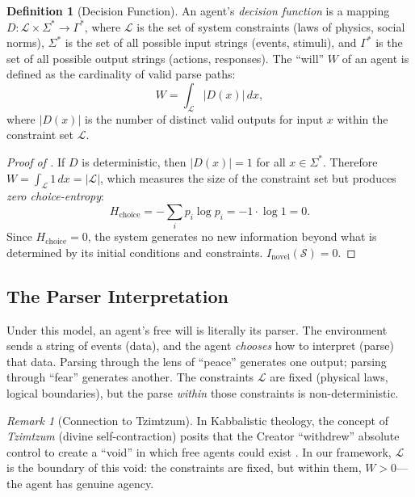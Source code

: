 \documentclass[12pt, a4paper]{article}
\theoremstyle{plain}
\theoremstyle{definition}
\newtheorem{definition}[theorem]{Definition}
\theoremstyle{remark}
\newtheorem{remark}[theorem]{Remark}
\newcommand{\calL}{\mathcal{L}}
\newcommand{\calS}{\mathcal{S}}
\begin{document}
\begin{definition}[Decision Function]\label{def:decision}
  An agent's \emph{decision function} is a mapping
  $D: \calL \times \Sigma^* \to \Gamma^*$, where $\calL$ is the set of
  system constraints (laws of physics, social norms), $\Sigma^*$ is the
  set of all possible input strings (events, stimuli), and $\Gamma^*$
  is the set of all possible output strings (actions, responses). The
  ``will'' $W$ of an agent is defined as the cardinality of valid parse
  paths:
  \begin{equation}\label{eq:will}
    W = \int_{\calL} |D(x)|\, dx,
  \end{equation}
  where $|D(x)|$ is the number of distinct valid outputs for input $x$
  within the constraint set $\calL$.
\end{definition}

\begin{proof}[Proof of ]
  If $D$ is deterministic, then $|D(x)| = 1$ for all $x \in \Sigma^*$.
  Therefore $W = \int_{\calL} 1\, dx = |\calL|$, which measures the
  size of the constraint set but produces \emph{zero choice-entropy}:
  \begin{equation}
    H_{\text{choice}} = -\sum_i p_i \log p_i = -1 \cdot \log 1 = 0.
  \end{equation}
  Since $H_{\text{choice}} = 0$, the system generates no new information
  beyond what is determined by its initial conditions and constraints.
  $I_{\text{novel}}(\calS) = 0$. \qedhere
\end{proof}

\subsection{The Parser Interpretation}

Under this model, an agent's free will is literally its parser. The
environment sends a string of events (data), and the agent \emph{chooses}
how to interpret (parse) that data. Parsing through the lens of ``peace''
generates one output; parsing through ``fear'' generates another. The
constraints $\calL$ are fixed (physical laws, logical boundaries), but
the parse \emph{within} those constraints is non-deterministic.

\begin{remark}[Connection to Tzimtzum]
  In Kabbalistic theology, the concept of \emph{Tzimtzum} (divine
  self-contraction) posits that the Creator ``withdrew'' absolute control
  to create a ``void'' in which free agents could exist \citep{Scholem1941}.
  In our framework, $\calL$ is the boundary of this void: the constraints
  are fixed, but within them, $W > 0$---the agent has genuine agency.
\end{remark}
\end{document}
